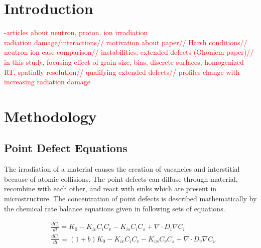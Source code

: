 \documentclass[utf8]{frontiersSCNS} %
\begin{document}
\section{Introduction}

\textcolor{red}{
-articles about neutron, proton, ion irradiation\\
radiation damage/interactions//
motivation about paper//
Harsh conditions//
neutron-ion case comparison//
instabilities, extended defects (Ghoniem paper)//
in this study, focusing effect of grain size, bias, discrete surfaces,
homogenized RT, spatially resolution//
qualifying extended defects//
profiles change with increasing radiation damage
}

\section{Methodology}



\subsection{Point Defect Equations}
    The irradiation of a material causes the creation of vacancies and interstitial because of atomic collisions. The point defects can diffuse through material, recombine with each other, and react with sinks which are present in microstructure. The concentration of point defects is described mathematically by the chemical rate balance equations given in following sets of equations.

\begin{equation}
  \begin{aligned}
    &\frac{dC_i}{dt} = K_0 - K_{iv}C_iC_v - K_{is}C_iC_s + \nabla\cdot D_i\nabla C_i\\
    &\frac{dC_v}{dt} = (1+b)K_0 - K_{iv}C_iC_v - K_{vs}C_vC_s + \nabla\cdot D_v\nabla C_v
  \end{aligned}
  \label{equation:point_defect_equations}
\end{equation}
\end{document}

